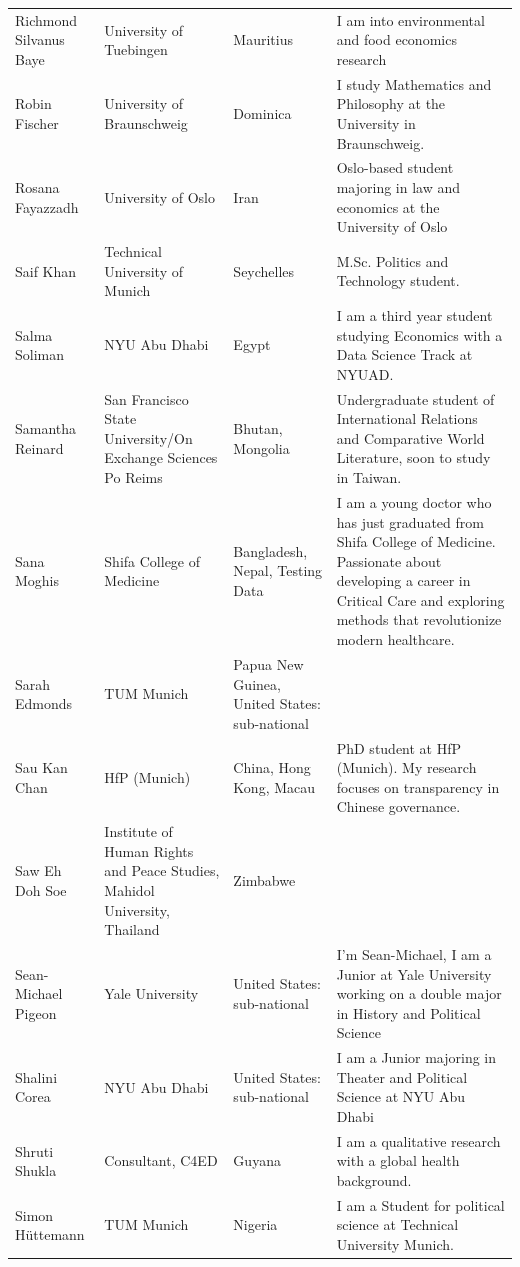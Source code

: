 \documentclass[
]{article}
\begin{document}
\begin{longtable}[t]{l>{\raggedright\arraybackslash}p{2cm}>{\raggedright\arraybackslash}p{2cm}>{\raggedright\arraybackslash}p{3cm}}
\addlinespace
Richmond Silvanus Baye & University of Tuebingen & Mauritius & I am into environmental and food economics research\\
\rowcolor{gray!6}  Robin Fischer & University of Braunschweig & Dominica & I study Mathematics and Philosophy at the University in Braunschweig.\\
Rosana Fayazzadh & University of Oslo & Iran & Oslo-based student majoring in law and economics at the University of Oslo\\
\rowcolor{gray!6}  Saif Khan & Technical University of Munich & Seychelles & M.Sc. Politics and Technology student.\\
Salma Soliman & NYU Abu Dhabi & Egypt & I am a third year student studying Economics with a Data Science Track at NYUAD.\\
\addlinespace
\rowcolor{gray!6}  Samantha Reinard & San Francisco State University/On Exchange Sciences Po Reims & Bhutan, Mongolia & Undergraduate student of International Relations and Comparative World Literature, soon to study in Taiwan.\\
Sana Moghis & Shifa College of Medicine & Bangladesh, Nepal, Testing Data & I am a young doctor who has just graduated from Shifa College of Medicine. Passionate about developing a career in Critical Care and exploring methods that revolutionize modern healthcare.\\
\rowcolor{gray!6}  Sarah Edmonds & TUM Munich & Papua New Guinea, United States: sub-national & \\
Sau Kan Chan & HfP (Munich) & China, Hong Kong, Macau & PhD student at HfP (Munich). My research focuses on transparency in Chinese governance.\\
\rowcolor{gray!6}  Saw Eh Doh Soe & Institute of Human Rights and Peace Studies, Mahidol University, Thailand & Zimbabwe & \\
\addlinespace
Sean-Michael Pigeon & Yale University & United States: sub-national & I'm Sean-Michael, I am a Junior at Yale University working on a double major in History and Political Science\\
\rowcolor{gray!6}  Shalini Corea & NYU Abu Dhabi & United States: sub-national & I am a Junior majoring in Theater and Political Science at NYU Abu Dhabi\\
Shruti Shukla & Consultant, C4ED & Guyana & I am a qualitative research with a global health background.\\
\rowcolor{gray!6}  Simon Hüttemann & TUM Munich & Nigeria & I am a Student for political science at Technical University Munich.\\

\end{longtable}
\end{document}
